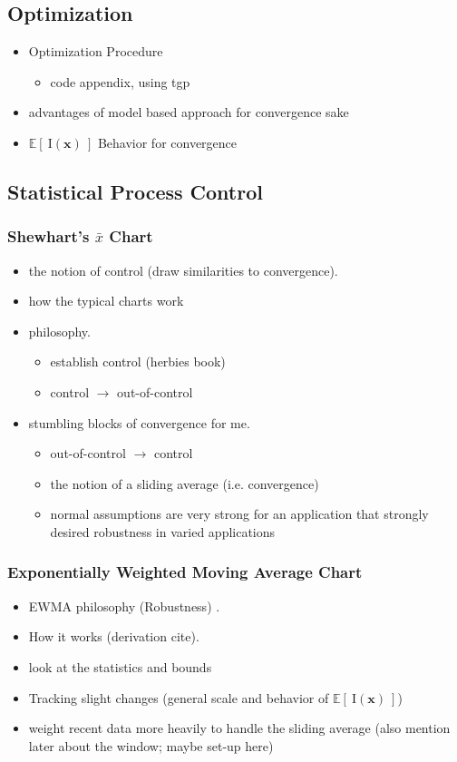 \documentclass[12pt]{article}
\def \EIx {
	\mathbb{E}\left[~\text{I}(\bm{x})~\right]
}
\begin{document}
	\subsection{Optimization}
	\begin{itemize}
	\item Optimization Procedure \cite{tgp2}
		\begin{itemize}
		\item code appendix, using tgp
		\end{itemize}
	\item advantages of model based approach for convergence sake
	\item $\EIx$ Behavior for convergence
	\end{itemize}
	\subsection{Statistical Process Control}
		\subsubsection{Shewhart's $\bar{x}$ Chart}
		\begin{itemize}
		\item the notion of control (draw similarities to convergence). \cite{shewhartBook}
		\item how the typical charts work
		\item philosophy.
			\begin{itemize}
			\item establish control (herbies book)
			\item control $\rightarrow$ out-of-control 
			\end{itemize}
		\item stumbling blocks of convergence for me.
			\begin{itemize}
			\item out-of-control $\rightarrow$ control
			\item the notion of a sliding average (i.e. convergence)
			\item normal assumptions are very strong for an application that strongly desired robustness in varied applications%
			\end{itemize}
		\end{itemize}
		\subsubsection{Exponentially Weighted Moving Average Chart}
		\begin{itemize}
		\item EWMA philosophy (Robustness) \cite{boxBook}.
		\item How it works ({\color{red}derivation cite}).
		\item look at the statistics and bounds
		\item Tracking slight changes (general scale and behavior of $\EIx$) 
		\item weight recent data more heavily to handle the sliding average (also mention later about the window; maybe set-up here)%
		\end{itemize}
\end{document}
